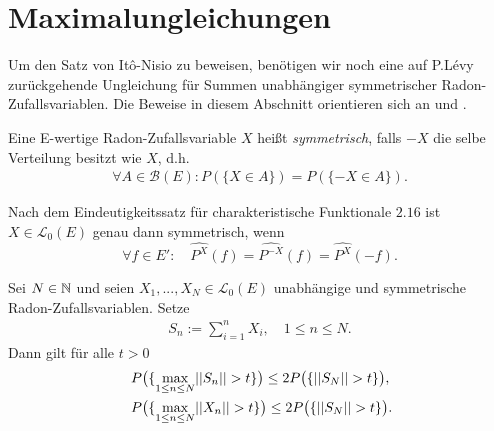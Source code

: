 \section{Maximalungleichungen}
Um den Satz von Itô-Nisio zu beweisen, benötigen wir noch eine auf P.Lévy zurückgehende Ungleichung für Summen unabhängiger symmetrischer Radon-Zufallsvariablen. 
Die Beweise in diesem Abschnitt orientieren sich an \cite{li-queffelec} und \cite{bauer}. 
\begin{mydef}
    Eine E-wertige Radon-Zufallsvariable $X$ heißt \textit{symmetrisch}, falls $-X$ die selbe Verteilung besitzt wie $X$, d.h.
    \begin{align*}
        \forall A \in \mathcal{B}(E): P(\{X \in A\}) = P(\{-X \in A\}). 
    \end{align*}
\end{mydef}

\begin{remark}
    Nach dem Eindeutigkeitssatz für charakteristische Funktionale $2.16$ ist $X \in \mathcal{L}_0(E)$ genau dann symmetrisch, wenn 
    $$
        \forall f \in E': \quad \widehat{P^X}(f) = \widehat{P^{-X}}(f) = \widehat{P^X}(-f). 
    $$
\end{remark}

\begin{theorem}
    Sei $N \in \mathbb{N}$ und seien $X_1,...,X_N \in \mathcal{L}_0(E)$ unabhängige und symmetrische Radon-Zufallsvariablen. Setze 
    \begin{align*}
        S_n := \sum_{i=1}^n X_i, \quad 1 \leq n \leq N. 
    \end{align*}
    Dann gilt für alle $t > 0$
    \begin{align}
        &P\big(\{ \max_{1 \leq n \leq N} \lvert\lvert S_n \rvert\rvert > t \}\big) \leq 2 P\big(\{\lvert\lvert S_N \rvert\rvert > t \}\big), \\\
        &P\big(\{ \max_{1 \leq n \leq N} \lvert\lvert X_n \rvert\rvert > t \}\big) \leq 2 P\big(\{\lvert\lvert S_N \rvert\rvert > t \}\big).
    \end{align}
\end{theorem}

